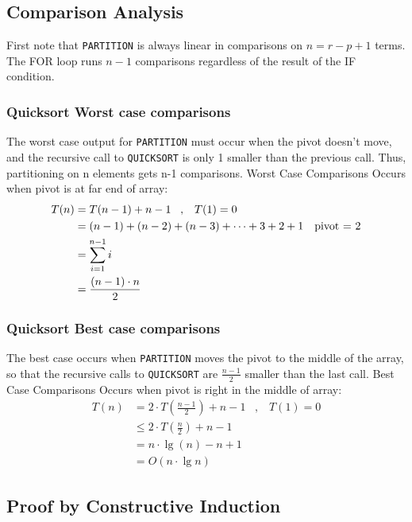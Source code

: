 \documentclass[english, 10pt]{article}
\begin{document}
\subsection{Comparison Analysis}

First note that \texttt{PARTITION} is always linear in comparisons on $n=r-p+1$ terms.
The FOR loop runs $n-1$ comparisons regardless of the result of the IF condition.

\subsubsection{Quicksort Worst case comparisons}

The worst case output for \texttt{PARTITION} must occur when the pivot doesn't move,
and the recursive call to \texttt{QUICKSORT} is only 1 smaller than the previous call.
Thus, partitioning on n elements gets n-1 comparisons.
Worst Case Comparisons Occurs when pivot is at far end of array:
\begin{align*}
    T(n) & = T(n-1)+n-1 \;\;\;,\;\;\; T(1) =0 \\
         & =(n-1) + (n-2) + (n-3) + \cdots + 3 + 2 + 1 & \text{pivot = 2} \\
         & =\sum_{i=1}^{n-1}i \\
         & = \frac{(n-1)\cdot n}{2}
\end{align*}

\subsubsection{Quicksort Best case comparisons}

The best case occurs when \texttt{PARTITION} moves the pivot to the middle of the array,
so that the recursive calls to \texttt{QUICKSORT} are $\frac{n-1}{2}$ smaller than the last call.
Best Case Comparisons Occurs when pivot is right in the middle of array:
\begin{align*}
    T(n) & = 2\cdot T(\frac{n-1}{2})+n-1 \;\;\;,\;\;\; T(1) =0 \\
         & \le2\cdot T(\frac{n}{2}) +n -1 \\
         & = n\cdot\lg(n) -n +1 \\
         & =O(n\cdot\lg n)
\end{align*}

\subsection{Proof by Constructive Induction}
\end{document}
